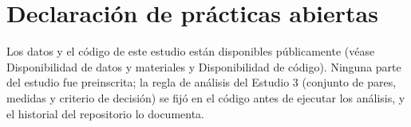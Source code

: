 \documentclass[man,donotrepeattitle,floatsintext]{apa7}
\begin{document}
\section*{Declaración de prácticas abiertas}

Los datos y el código de este estudio están disponibles públicamente (véase Disponibilidad de datos y materiales y Disponibilidad de código). Ninguna parte del estudio fue preinscrita; la regla de análisis del Estudio 3 (conjunto de pares, medidas y criterio de decisión) se fijó en el código antes de ejecutar los análisis, y el historial del repositorio lo documenta.

\printbibliography
\end{document}
